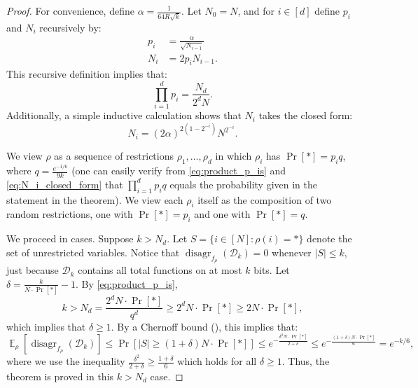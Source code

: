 \documentclass[10pt,a4paper]{article}
\newcommand{\E}{\mathop{\mathbb{E}}}
\DeclareMathOperator{\disagr}{\mathrm{disagr}}
\begin{document}
\begin{proof}
For convenience, define $\alpha = \frac{1}{64R\sqrt{k}}$. Let $N_0 = N$, and for $i \in [d]$ define $p_i$ and $N_i$ recursively by:
\begin{align*}
p_i &= \frac{\alpha}{\sqrt{N_{i-1}}}\\
N_i &= 2p_iN_{i-1}.
\end{align*}
This recursive definition implies that:
\begin{equation}
\label{eq:product_p_is}
\prod_{i=1}^d p_i = \frac{N_d}{2^dN}.
\end{equation}
Additionally, a simple inductive calculation shows that $N_i$ takes the closed form:
\begin{equation}
\label{eq:N_i_closed_form}
N_i = (2\alpha)^{2(1 - 2^{-i})} N^{2^{-i}}.
\end{equation}

We view $\rho$ as a sequence of restrictions $\rho_1,\ldots,\rho_d$ in which $\rho_i$ has $\Pr[*] = p_iq$, where $q = \frac{e^{-1/6}}{9k}$ (one can easily verify from \eqref{eq:product_p_is} and \eqref{eq:N_i_closed_form} that $\prod_{i=1}^d p_iq$ equals the probability given in the statement in the theorem). We view each $\rho_i$ itself as the composition of two random restrictions, one with $\Pr[*] = p_i$ and one with $\Pr[*] = q$.

We proceed in cases. Suppose $k > N_d$. Let $S = \{i \in [N]: \rho(i) = *\}$ denote the set of unrestricted variables. Notice that $\disagr_{f_\rho}\left(\mathcal{D}_k\right) = 0$ whenever $|S| \le k$, just because $\mathcal{D}_k$ contains all total functions on at most $k$ bits. Let $\delta = \frac{k}{N\cdot\Pr[*]} - 1$. By \eqref{eq:product_p_is},
\[
k > N_d = \frac{2^d N\cdot\Pr[*]}{q^d} \ge 2^d N\cdot\Pr[*] \ge 2N\cdot\Pr[*],
\]
which implies that $\delta \ge 1$. By a Chernoff bound (), this implies that:
\[
\E_\rho\left[\disagr_{f_\rho}\left(\mathcal{D}_k\right)\right] \le \Pr\left[|S| \ge (1 + \delta)N\cdot\Pr[*]\right] \le e^{-\frac{\delta^2 N\cdot\Pr[*]}{2 + \delta}} \le e^{-\frac{(1 + \delta) N\cdot\Pr[*]}{6}} = e^{-k/6},
\]
where we use the inequality $\frac{\delta^2}{2+\delta} \ge \frac{1 + \delta}{6}$ which holds for all $\delta \ge 1$. Thus, the theorem is proved in this $k > N_d$ case.


\end{proof}
\end{document}
